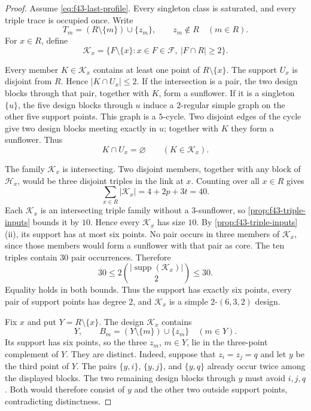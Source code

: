 \documentclass[10pt,a4paper]{amsart}
\newcommand{\F}{\mathcal F}
\newcommand{\Hh}{\mathcal H}
\newcommand{\K}{\mathcal K}
\newcommand{\supp}{\operatorname{supp}}
\begin{document}
\begin{proof}
Assume \cref{eq:f43-last-profile}. Every singleton class is saturated, and
every triple trace is occupied once. Write
\[
 T_m=(R\setminus\{m\})\cup\{z_m\},
 \qquad z_m\notin R
 \quad(m\in R).
\]
For $x\in R$, define
\[
 \K_x=\{F\setminus\{x\}:x\in F\in\F,\ |F\cap R|\ge2\}.
\]

Every member $K\in\K_x$ contains at least one point of
$R\setminus\{x\}$. The support $U_x$ is disjoint from $R$. Hence
$|K\cap U_x|\le2$. If the intersection is a pair, the two design blocks
through that pair, together with $K$, form a sunflower. If it is a singleton
$\{u\}$, the five design blocks through $u$ induce a $2$-regular simple graph
on the other five support points. This graph is a $5$-cycle. Two disjoint
edges of the cycle give two design blocks meeting exactly in $u$; together
with $K$ they form a sunflower. Thus
\begin{equation}
 K\cap U_x=\varnothing\qquad(K\in\K_x).
 \label{eq:f43-K-avoids}
\end{equation}

The family $\K_x$ is intersecting. Two disjoint members, together with any
block of $\Hh_x$, would be three disjoint triples in the link at $x$.
Counting over all $x\in R$ gives
\[
 \sum_{x\in R}|\K_x|=4+2p+3t=40.
\]
Each $\K_x$ is an intersecting triple family without a $3$-sunflower, so
\cref{prop:f43-triple-inputs} bounds it by $10$. Hence every $\K_x$ has
size $10$. By \cref{prop:f43-triple-inputs}(ii), its support has at most six
points. No pair occurs in three members of $\K_x$, since those members would
form a sunflower with that pair as core. The ten triples contain $30$ pair
occurrences. Therefore
\[
 30\le2\binom{|\supp(\K_x)|}{2}\le30.
\]
Equality holds in both bounds. Thus the support has exactly six points, every
pair of support points has degree $2$, and $\K_x$ is a simple
$2$-$(6,3,2)$ design.

Fix $x$ and put $Y=R\setminus\{x\}$. The design $\K_x$ contains
\[
 Y,
 \qquad
 B_m=(Y\setminus\{m\})\cup\{z_m\}
 \quad(m\in Y).
\]
Its support has six points, so the three $z_m$, $m\in Y$, lie in the
three-point complement of $Y$. They are distinct. Indeed, suppose that
$z_i=z_j=q$ and let $y$ be the third point of $Y$. The pairs
$\{y,i\}$, $\{y,j\}$, and $\{y,q\}$ already occur twice among the displayed
blocks. The two remaining design blocks through $y$ must avoid $i,j,q$.
Both would therefore consist of $y$ and the other two outside support points,
contradicting distinctness.


\end{proof}
\end{document}
